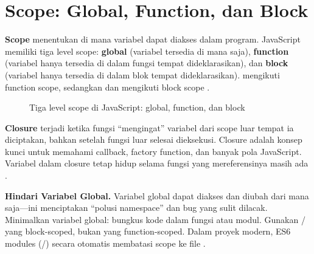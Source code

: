 ﻿\section{Scope: Global, Function, dan Block}

\textbf{Scope} menentukan di mana variabel dapat diakses dalam program. JavaScript memiliki tiga level scope: \textbf{global} (variabel tersedia di mana saja), \textbf{function} (variabel hanya tersedia di dalam fungsi tempat dideklarasikan), dan \textbf{block} (variabel hanya tersedia di dalam blok \code{\{ \}} tempat dideklarasikan).  mengikuti function scope, sedangkan  dan  mengikuti block scope \cite{jsInfo}.

\begin{figure}[H]
\centering
{}
\caption{Tiga level scope di JavaScript: global, function, dan block}
\end{figure}

\textbf{Closure} terjadi ketika fungsi ``mengingat'' variabel dari scope luar tempat ia diciptakan, bahkan setelah fungsi luar selesai dieksekusi. Closure adalah konsep kunci untuk memahami callback, factory function, dan banyak pola JavaScript. Variabel dalam closure tetap hidup selama fungsi yang mereferensinya masih ada \cite{mdnJsGuide}.

\begin{konsep}
\textbf{Hindari Variabel Global.} Variabel global dapat diakses dan diubah dari mana saja---ini menciptakan ``polusi namespace'' dan bug yang sulit dilacak. Minimalkan variabel global: bungkus kode dalam fungsi atau modul. Gunakan / yang block-scoped, bukan  yang function-scoped. Dalam proyek modern, ES6 modules (/) secara otomatis membatasi scope ke file \cite{jsInfo}.
\end{konsep}


